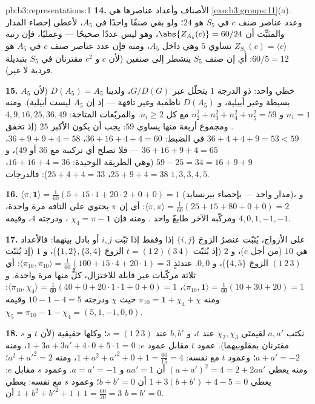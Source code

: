 \begin{solution}{pb:b3:representations:1}
\textbf{14.} الأصناف وأعداد عناصرها هي \cref{exo:b3:groups:11}(a). وعدد
عناصر صنف $c$ في $S_5$ هو $24$؛ ولو بقي صنفًا واحدًا في $A_5$،
لأعطى إحصاء المدار والمثبِّت أن $\abs{Z_{A_5}(c)} = 60/24$، وهو ليس عددًا صحيحًا
--- وعمليًا، فإن رتبة $Z_{S_5}(c) = \langle c\rangle$ تساوي $5$ وهي داخل $A_5$، ومنه
فإن عدد عناصر صنف $c$ في $A_5$ هو $60/5 =
12$: أي إن صنف $S_5$
ينشطر إلى صنفين (لأن $c$ و $c^2$ مقترنان في $S_5$ بتبديلة
فردية لا غير).

\textbf{15.}  خطي واحد:  ذو الدرجة $1$ يتحلّل عبر
$G/D(G)$، ولدينا $D(A_5) = A_5$ (لأن $A_5$ بسيطة وغير أبيلية،
و $D(A_5)$ ناظمية وغير تافهة --- إذ إن $A_5$ ليست أبيلية).
ومنه $n_1 = 1$ و $n_2^2 + n_3^2 + n_4^2
+ n_5^2 = 59$ مع كل $n_i \geq 2$. والمربّعات
المتاحة: $4, 9,
16, 25, 36, 49$. ومجموع أربعة منها يساوي $59$: يجب أن يكون
الأكبر $25$ (إذ تخفق $36 + 4 + 4 + 9 = 53 < 59$ في الضبط: $36 + 16 + 4 + 4 = 60$، $36 + 9 + 9 + 4 = 58$،
$36 +
16 + 9 + 4 = 65$ --- فلا تصلح أي تركيبة مع $36$ أو $49$)، و $59 - 25 = 34 = 16 + 9 + 9$
(وهي الطريقة الوحيدة: $16 + 16 + 4 =
36$، $25 + 9 + 4 = 38$، $25 + 4 + 4 = 33$): فالدرجات
$1, 3, 3,
4, 5$.

\textbf{16.} $\langle\pi, \mathbf 1\rangle = \frac1{60}(5 +
15\cdot1 + 20\cdot2 + 0 + 0) = 1$ (مدار واحد --- بإحصاء بيرنسايد)، و
$\langle\pi, \pi\rangle = \frac1{60}(25 + 15 + 80 +
0 + 0) = 2$: أي إن $\pi$ يحتوي على  التافه مرة واحدة، ومركّبه
الآخر طابعٌ واحد . ومنه فإن $\chi_4 = \pi
- \mathbf 1$ ، ودرجته $4$، وقيمه $4, 0,
1, -1, -1$.

\textbf{17.} على الأزواج، يُثبّت عنصرٌ الزوجَ $\{i,j\}$ إذا وفقط
إذا ثبّت $i, j$ أو بادل بينهما: فالأعداد هي $10$ (من أجل $e$)،
و $2$ (إذ يُثبّت $t =
(1\,2)(3\,4)$ الزوجَ $\{1,2\}, \{3,4\}$)، و $1$ (إذ يُثبّت
$(1\,2\,3)$ الزوجَ $\{4,5\}$)، و $0, 0$. عندئذٍ $\langle\pi_{10},
\pi_{10}\rangle = \frac1{60}(100 + 15\cdot4 + 20\cdot1) = 3$: أي
ثلاثة مركّبات غير قابلة للاختزال، كلٌّ منها مرة واحدة. و
$\langle\pi_{10}, \mathbf 1\rangle = \frac1{60}(10 + 30 + 20)
= 1$، $\langle\pi_{10}, \chi_4\rangle = \frac1{60}(40 + 0 +
20\cdot1\cdot1 + 0 + 0) = 1$: ومنه $\pi_{10} = \mathbf 1 + \chi_4
+ \chi$ حيث $\chi$ 
ودرجته $10 - 1 - 4 = 5$ وقيمه $\chi_5 = \pi_{10} - \mathbf 1 - \chi_4 = (5, 1, -1, 0,
0)$.

\textbf{18.} نكتب $a, a'$ لقيمتَي $\chi_2, \chi_3$ عند $t$،
و $b, b'$ عند $s = (1\,2\,3)$؛ وكلها حقيقية (لأن $t$ و $s$
مقترنان بمقلوبيهما). عمود $t$ مقابل عمود $e$: $1 + 3a + 3a' + 4\cdot0 + 5\cdot1 = 0$، ومنه
$a + a'
= -2$؛ وعمود $t$ مع نفسه: $1 + a^2 + a'^2 + 0 + 1 =
\frac{60}{15} = 4$، ومنه $a^2 + a'^2 = 2$؛
ومنه يعطي $(a + a')^2 = 4
= 2 + 2aa'$ أن $aa' = 1$ و $a = a' = -1$. وعمود $s$
مقابل $e$: يعطي $1 + 3(b + b') + 4 - 5 = 0$ أن $b + b' = 0$؛ وعمود $s$ مع نفسه:
يعطي $1 + b^2 + b'^2 + 1 + 1 = \frac{60}
{20} = 3$ أن $b = b' = 0$.


\end{solution}
